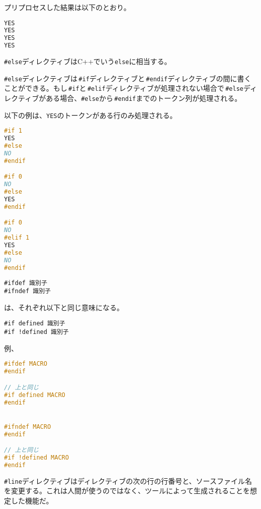 プリプロセスした結果は以下のとおり。

\begin{lstlisting}[language={C++}]
YES
YES
YES
YES
\end{lstlisting}


\texttt{\#else}ディレクティブはC++でいう\texttt{else}に相当する。

\texttt{\#else}ディレクティブは\,\texttt{\#if}ディレクティブと\,\texttt{\#endif}ディレクティブの間に書くことができる。もし\,\texttt{\#if}と\,\texttt{\#elif}ディレクティブが処理されない場合で\,\texttt{\#else}ディレクティブがある場合、\texttt{\#else}から\,\texttt{\#endif}までのトークン列が処理される。

以下の例は、\texttt{YES}のトークンがある行のみ処理される。

\begin{lstlisting}[language={C++}]
#if 1
YES
#else
NO
#endif

#if 0
NO
#else
YES
#endif

#if 0
NO
#elif 1
YES
#else
NO
#endif
\end{lstlisting}


\begin{lstlisting}[style=grammar]
#ifdef 識別子
#ifndef 識別子
\end{lstlisting}
は、それぞれ以下と同じ意味になる。

\ifTombow\pagebreak\fi
\begin{lstlisting}[style=grammar]
#if defined 識別子
#if !defined 識別子
\end{lstlisting}

例、

\begin{lstlisting}[language={C++}]
#ifdef MACRO
#endif

// 上と同じ
#if defined MACRO
#endif


#ifndef MACRO
#endif

// 上と同じ
#if !defined MACRO
#endif
\end{lstlisting}


\texttt{\#line}ディレクティブはディレクティブの次の行の行番号と、ソースファイル名を変更する。これは人間が使うのではなく、ツールによって生成されることを想定した機能だ。

